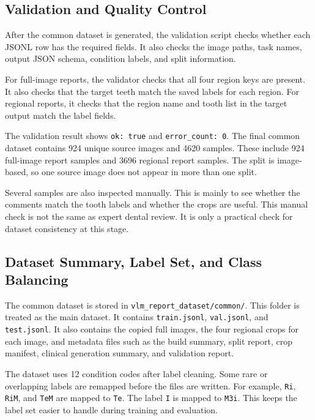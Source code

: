 \documentclass[a4paper,12pt]{report}
\begin{document}
\subsection{Validation and Quality Control}

After the common dataset is generated, the validation script checks whether each JSONL row has the required fields. It also checks the image paths, task names, output JSON schema, condition labels, and split information.

For full-image reports, the validator checks that all four region keys are present. It also checks that the target teeth match the saved labels for each region. For regional reports, it checks that the region name and tooth list in the target output match the label fields.

The validation result shows \texttt{ok: true} and \texttt{error\_count: 0}. The final common dataset contains 924 unique source images and 4620 samples. These include 924 full-image report samples and 3696 regional report samples. The split is image-based, so one source image does not appear in more than one split.

Several samples are also inspected manually. This is mainly to see whether the comments match the tooth labels and whether the crops are useful. This manual check is not the same as expert dental review. It is only a practical check for dataset consistency at this stage.


\subsection{Dataset Summary, Label Set, and Class Balancing}

The common dataset is stored in \texttt{vlm\_report\_dataset/common/}. This folder is treated as the main dataset. It contains \texttt{train.jsonl}, \texttt{val.jsonl}, and \texttt{test.jsonl}. It also contains the copied full images, the four regional crops for each image, and metadata files such as the build summary, split report, crop manifest, clinical generation summary, and validation report.

The dataset uses 12 condition codes after label cleaning. Some rare or overlapping labels are remapped before the files are written. For example, \texttt{Ri}, \texttt{RiM}, and \texttt{TeM} are mapped to \texttt{Te}. The label \texttt{I} is mapped to \texttt{M3i}. This keeps the label set easier to handle during training and evaluation.
\end{document}
